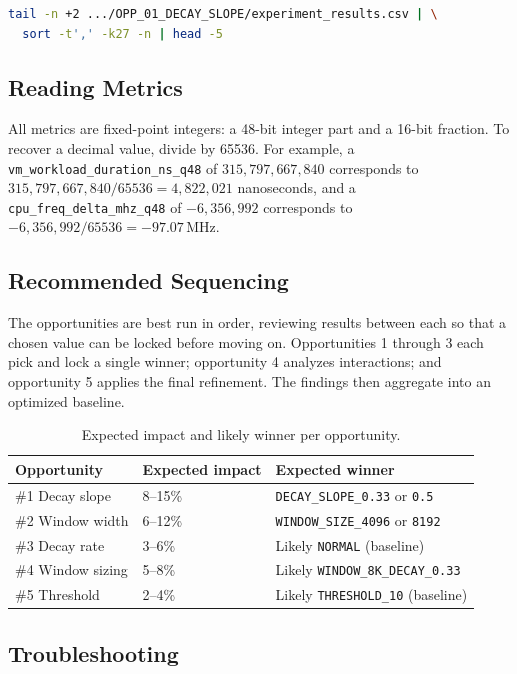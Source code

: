 \begin{lstlisting}[language=bash]
tail -n +2 .../OPP_01_DECAY_SLOPE/experiment_results.csv | \
  sort -t',' -k27 -n | head -5
\end{lstlisting}

\subsection{Reading \Qtype{} Metrics}

All metrics are \Qtype{} fixed-point integers: a 48-bit integer part and a
16-bit fraction. To recover a decimal value, divide by 65536. For example, a
\texttt{vm\_workload\_duration\_ns\_q48} of $315{,}797{,}667{,}840$ corresponds
to $315{,}797{,}667{,}840 / 65536 = 4{,}822{,}021$ nanoseconds, and a
\texttt{cpu\_freq\_delta\_mhz\_q48} of $-6{,}356{,}992$ corresponds to
$-6{,}356{,}992 / 65536 = -97.07$\,MHz.

\subsection{Recommended Sequencing}

The opportunities are best run in order, reviewing results between each so that
a chosen value can be locked before moving on. Opportunities 1 through 3 each
pick and lock a single winner; opportunity 4 analyzes interactions; and
opportunity 5 applies the final refinement. The findings then aggregate into an
optimized baseline.

\begin{table}[h]
\centering
\begin{tabular}{lll}
\toprule
Opportunity & Expected impact & Expected winner \\
\midrule
\#1 Decay slope & 8--15\% & \texttt{DECAY\_SLOPE\_0.33} or \texttt{0.5} \\
\#2 Window width & 6--12\% & \texttt{WINDOW\_SIZE\_4096} or \texttt{8192} \\
\#3 Decay rate & 3--6\% & Likely \texttt{NORMAL} (baseline) \\
\#4 Window sizing & 5--8\% & Likely \texttt{WINDOW\_8K\_DECAY\_0.33} \\
\#5 Threshold & 2--4\% & Likely \texttt{THRESHOLD\_10} (baseline) \\
\bottomrule
\end{tabular}
\caption{Expected impact and likely winner per opportunity.}
\end{table}

\subsection{Troubleshooting}

